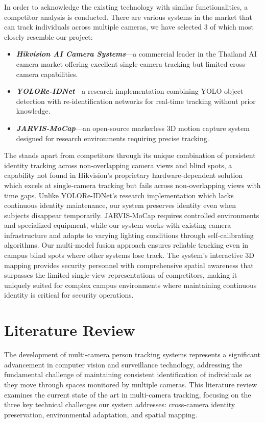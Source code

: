 In order to acknowledge the existing technology with similar functionalities, a competitor analysis is conducted.
There are various systems in the market that can track individuals across multiple cameras, we have selected 3 of which most closely resemble our project:

\begin{itemize}
   \item \textbf{\textit{Hikvision AI Camera Systems}}---a commercial leader in the Thailand AI camera market offering excellent single-camera tracking but limited cross-camera capabilities.
   \item \textbf{\textit{YOLORe-IDNet}}---a research implementation combining YOLO object detection with re-identification networks for real-time tracking without prior knowledge.
   \item \textbf{\textit{JARVIS-MoCap}}---an open-source markerless 3D motion capture system designed for research environments requiring precise tracking.
\end{itemize}
\par
The \usevar{\srsTitle} stands apart from competitors through its unique combination of persistent identity tracking across non-overlapping camera views and blind spots, a capability not found in Hikvision's proprietary hardware-dependent solution which excels at single-camera tracking but fails across non-overlapping views with time gaps. Unlike YOLORe-IDNet's research implementation which lacks continuous identity maintenance, our system preserves identity even when subjects disappear temporarily. JARVIS-MoCap requires controlled environments and specialized equipment, while our system works with existing camera infrastructure and adapts to varying lighting conditions through self-calibrating algorithms. Our multi-model fusion approach ensures reliable tracking even in campus blind spots where other systems lose track. The system's interactive 3D mapping provides security personnel with comprehensive spatial awareness that surpasses the limited single-view representations of competitors, making it uniquely suited for complex campus environments where maintaining continuous identity is critical for security operations.

\section{Literature Review}
\label{section:literature-review}

The development of multi-camera person tracking systems represents a significant advancement in computer vision and surveillance technology, addressing the fundamental challenge of maintaining consistent identification of individuals as they move through spaces monitored by multiple cameras. This literature review examines the current state of the art in multi-camera tracking, focusing on the three key technical challenges our system addresses: cross-camera identity preservation, environmental adaptation, and spatial mapping.

